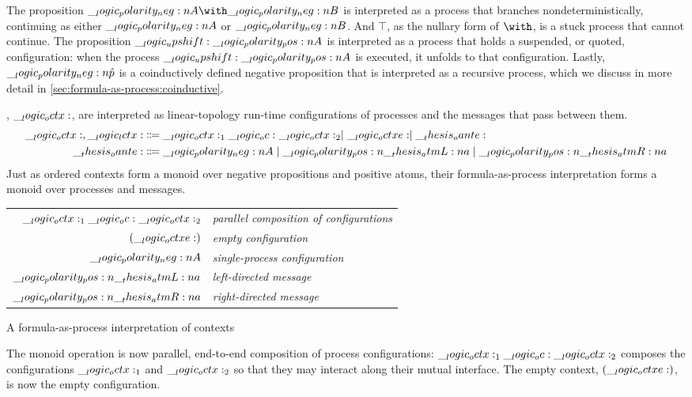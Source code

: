   The proposition $\n{A} \with \n{B}$ is interpreted as a process that branches nondeterministically, continuing as either $\__logic_polarity_neg:n {A}$ or $\__logic_polarity_neg:n {B}$.
  And $\top$, as the nullary form of $\with$, is a stuck process that cannot continue.
  The proposition $\__logic_upshift: \__logic_polarity_pos:n {A}$ is interpreted as a process that holds a suspended, or quoted, configuration:
  when the process $\__logic_upshift: \__logic_polarity_pos:n {A}$ is executed, it unfolds to that configuration.
  Lastly, $\__logic_polarity_neg:n {\hat{p}}$ is a coinductively defined negative proposition that is interpreted as a recursive process, which we discuss in more detail in \cref{sec:formula-as-process:coinductive}.

, $\__logic_octx:$, are interpreted as linear-topology run-time configurations of processes and the messages that pass between them.
\begin{align*}
  \__logic_octx: , \__logic_lctx: &\Coloneqq \__logic_octx:_1 \__logic_oc: \__logic_octx:_2 \mid \__logic_octxe: \mid \__thesis_oante: \\
  \__thesis_oante: &\Coloneqq \__logic_polarity_neg:n {A} \mid \__logic_polarity_pos:n {\__thesis_atmL:n {a}} \mid \__logic_polarity_pos:n {\__thesis_atmR:n {a}}
\end{align*}
Just as ordered contexts form a monoid over negative propositions and positive atoms, their formula-as-process interpretation forms a monoid over processes and messages.
%
\begin{margintable}
  \begin{center}
    \begin{tabular}{@{}r@{\enspace}>{\itshape}l@{}}
      $\__logic_octx:_1 \__logic_oc: \__logic_octx:_2$ & parallel composition of configurations \\
      $(\__logic_octxe:)$ & empty configuration \\
      $\__logic_polarity_neg:n {A}$ & single-process configuration \\
      $\__logic_polarity_pos:n {\__thesis_atmL:n {a}}$ & left-directed message \\
      $\__logic_polarity_pos:n {\__thesis_atmR:n {a}}$ & right-directed message
    \end{tabular}
  \end{center}
  \caption{A formula-as-process interpretation of contexts}\label{fig:choreographies:ctxprop-table}
\end{margintable}%
%
The monoid operation is now parallel, end-to-end composition of process configurations: $\__logic_octx:_1 \__logic_oc: \__logic_octx:_2$ composes the configurations $\__logic_octx:_1$ and $\__logic_octx:_2$ so that they may interact along their mutual interface.
The empty context, $(\__logic_octxe:)$, is now the empty configuration.

